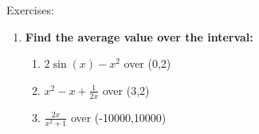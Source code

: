 \documentclass[../revisedmain.tex]{subfiles}
\begin{document}
	\begin{center}
		\LARGE Exercises:
	\end{center}
	\begin{enumerate}
		\item \textbf{Find the average value over the interval:}
		\begin{enumerate}
			\item $2\sin(x)-x^2$ over (0,2)
			\item $x^2-x+\frac{1}{2x}$ over (3,2)
			\item $\frac{2x}{x^2+1}$ over (-10000,10000)
		\end{enumerate}
	\end{enumerate}
\end{document}
